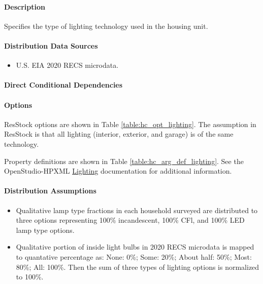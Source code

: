 \paragraph{Description}
% 
Specifies the type of lighting technology used in the housing unit.

\paragraph{Distribution Data Sources}
% 
\begin{itemize}
 
\item
  U.S. EIA 2020 RECS microdata.
\end{itemize}

\paragraph{Direct Conditional Dependencies}


\paragraph{Options}
ResStock options are shown in Table \ref{table:hc_opt_lighting}. The assumption in ResStock is that all lighting (interior, exterior, and garage) is of the same technology.



Property definitions are shown in Table \ref{table:hc_arg_def_lighting}. See the OpenStudio-HPXML \href{https://openstudio-hpxml.readthedocs.io/en/v1.10.0/workflow_inputs.html#hpxml-lighting}{Lighting} documentation for additional information.



\paragraph{Distribution Assumptions}
% 
\begin{itemize}
 
\item
  Qualitative lamp type fractions in each household surveyed are
  distributed to three options representing 100\% incandescent, 100\%
  CFl, and 100\% LED lamp type options.
\item
Qualitative portion of inside light bulbs in 2020 RECS microdata is 
mapped to quantative percentage as: 
None: 0\%; Some: 20\%; About half: 50\%; Most: 80\%; All: 100\%. 
Then the sum of three types of lighting options is normalized to 100\%.
\end{itemize}
